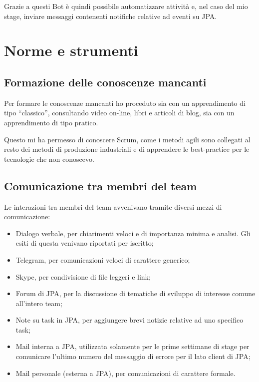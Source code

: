 Grazie a questi Bot è quindi possibile automatizzare attività e, nel caso del
mio stage, inviare messaggi contenenti notifiche relative ad eventi su JPA.

\section{Norme e strumenti}

\subsection{Formazione delle conoscenze mancanti}

Per formare le conoscenze mancanti ho proceduto sia con un apprendimento di
tipo ``classico'', consultando video on-line, libri e articoli di blog, sia con
un apprendimento di tipo pratico.

Questo mi ha permesso di conoscere Scrum, come i metodi agili sono collegati
al resto dei metodi di produzione industriali e di apprendere le
\gls{best-practice} per le tecnologie che non conoscevo.

\subsection{Comunicazione tra membri del team}

Le interazioni tra membri del team avvenivano tramite diversi mezzi di
comunicazione:

\begin{itemize}
\item Dialogo verbale, per chiarimenti veloci e di importanza minima e
  analisi. Gli esiti di questa venivano riportati per iscritto;
\item Telegram, per comunicazioni veloci di carattere generico;
\item Skype, per condivisione di file leggeri e link;
\item Forum di JPA, per la discussione di tematiche di sviluppo di interesse
  comune all'intero team;
\item Note su task in JPA, per aggiungere brevi notizie relative ad uno
  specifico task;
\item Mail interna a JPA, utilizzata solamente per le prime settimane di stage
  per comunicare l'ultimo numero del messaggio di errore per il lato client di
  JPA;
\item Mail personale (esterna a JPA), per comunicazioni di carattere formale.
\end{itemize}

